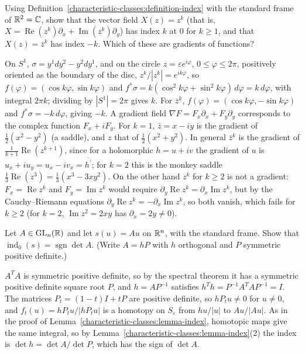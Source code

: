 \begin{exercise}\label{characteristic-classes:exercise-indices-plane}
Using Definition~\ref{characteristic-classes:definition-index} with the standard frame of $\mathbb{R}^2 = \mathbb{C}$, show that the vector field $X(z) = z^k$ (that is,
$X = \operatorname{Re}(z^k)\partial_x + \operatorname{Im}(z^k)\partial_y$) has index $k$ at $0$ for $k \geq 1$, and that $X(z) = \bar z^k$ has index $-k$. Which of these are gradients of functions?
\end{exercise}

\begin{solution}
On $S^1$, $\sigma = y^1dy^2 - y^2dy^1$, and on the circle $z = \varepsilon e^{i\varphi}$, $0 \leq \varphi \leq 2\pi$, positively oriented as the boundary of the disc, $z^k/|z^k| = e^{ik\varphi}$,
so $f(\varphi) = (\cos k\varphi, \sin k\varphi)$ and $f^*\sigma = k(\cos^2k\varphi + \sin^2k\varphi)\,d\varphi = k\,d\varphi$, with integral $2\pi k$; dividing by $|S^1| = 2\pi$ gives $k$. For $\bar z^k$,
$f(\varphi) = (\cos k\varphi, -\sin k\varphi)$ and $f^*\sigma = -k\,d\varphi$, giving $-k$. A gradient field $\nabla F = F_x\partial_x + F_y\partial_y$ corresponds to the complex function $F_x + iF_y$.
For $k = 1$, $\bar z = x - iy$ is the gradient of $\frac12(x^2 - y^2)$ (a saddle), and $z$ that of $\frac12(x^2 + y^2)$. In general $\bar z^k$ is the gradient of $\frac{1}{k+1}\operatorname{Re}(z^{k+1})$,
since for a holomorphic $h = u + iv$ the gradient of $u$ is $u_x + iu_y = u_x - iv_x = \overline{h^{\prime}}$; for $k = 2$ this is the monkey saddle
$\frac13\operatorname{Re}(z^3) = \frac13(x^3 - 3xy^2)$. On the other hand $z^k$ for
$k \geq 2$ is not a gradient: $F_x = \operatorname{Re}z^k$ and $F_y = \operatorname{Im}z^k$ would require $\partial_y\operatorname{Re}z^k = \partial_x\operatorname{Im}z^k$, but by the
Cauchy--Riemann equations $\partial_y\operatorname{Re}z^k = -\partial_x\operatorname{Im}z^k$, so both vanish, which fails for $k \geq 2$ (for $k = 2$, $\operatorname{Im}z^2 = 2xy$ has
$\partial_x = 2y \neq 0$).
\end{solution}

\begin{exercise}\label{characteristic-classes:exercise-linear-index}
Let $A \in \mathrm{GL}_n(\mathbb{R})$ and let $s(u) = Au$ on $\mathbb{R}^n$, with the standard frame. Show that $\operatorname{ind}_0(s) = \operatorname{sgn}\det A$. (Write $A = hP$ with $h$ orthogonal and $P$
symmetric positive definite.)
\end{exercise}

\begin{solution}
$A^TA$ is symmetric positive definite, so by the spectral theorem it has a symmetric positive definite square root $P$, and $h = AP^{-1}$ satisfies $h^Th = P^{-1}A^TAP^{-1} = I$. The matrices
$P_t = (1 - t)I + tP$ are positive definite, so $hP_tu \neq 0$ for $u \neq 0$, and $f_t(u) = hP_tu/|hP_tu|$ is a homotopy on $S_\varepsilon$ from $hu/|u|$ to $Au/|Au|$. As in the proof of
Lemma~\ref{characteristic-classes:lemma-index}, homotopic maps give the same integral, so by Lemma~\ref{characteristic-classes:lemma-index}(2) the index is $\det h = \det A/\det P$, which has the
sign of $\det A$.
\end{solution}

